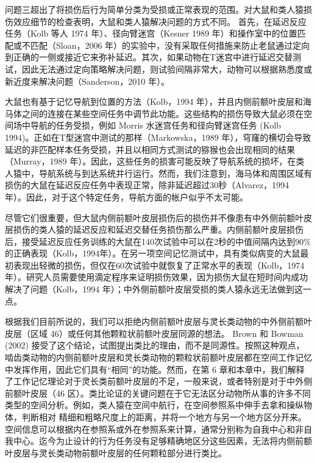\par 
问题三超出了将损伤后行为简单分类为受损或正常表现的范围。对大鼠和类人猿损伤效应细节的检查表明，大鼠和类人猿解决问题的方式不同。 首先，在延迟反应任务（Kolb 等人 1974 年）、径向臂迷宫（Kesner 1989 年）和操作室中的位置匹配或不匹配（Sloan，2006 年）的实验中，没有采取任何措施来防止老鼠通过定向到正确的一侧或接近它来弥补延迟。其次，如果动物在T迷宫中进行延迟交替测试，因此无法通过定向策略解决问题，则试验间隔非常大，动物可以根据熟悉度或新近度来解决问题（Sanderson，2010 年）。
\par 
大鼠也有基于记忆导航到位置的方法（Kolb，1994 年），并且内侧前额叶皮层和海马体之间的连接在某些空间任务中调节此功能。这些结构的损伤导致大鼠必须在空间场中导航的任务受损，例如 Morris 水迷宫任务和径向臂迷宫任务 (Kolb 1994)。正如在T型迷宫中测试的那样（Markowska，1989 年），穹窿的横切会导致延迟的非匹配样本任务受损，并且以相同方式测试的猕猴也会出现相同的结果（Murray，1989 年）。因此，这些任务的损害可能反映了导航系统的损坏，在类人猿中，导航系统与到达系统并行运行。然而，我们注意到，海马体和周围区域有损伤的大鼠在延迟反应任务中表现正常，除非延迟超过30秒（Alvarez，1994 年）。因此，对于这个特定任务，导航方面的帐户似乎不太可能。
\par 
尽管它们很重要，但大鼠内侧前额叶皮层损伤后的损伤并不像患有中外侧前额叶皮层损伤的类人猿的延迟反应和延迟交替任务损伤那么严重。内侧前额叶皮层损伤后，接受延迟反应任务训练的大鼠在140次试验中可以在2秒的中值间隔内达到90$\%$的正确表现（Kolb，1994年）。在另一项空间记忆测试中，具有类似病变的大鼠最初表现出轻微的损伤，但仅在60次试验中就恢复了正常水平的表现（Kolb，1974年）。研究人员需要使用滴定程序来证明损伤效果，因为损伤大鼠在短时间内成功解决了问题（Kolb，1994 年）；中外侧前额叶皮层受损的类人猿永远无法做到这一点。
\par 
根据我们目前所说的，我们可以拒绝内侧前额叶皮层与灵长类动物的中外侧前额叶皮层（区域 46）或任何其他颗粒状前额叶皮层同源的想法。 Brown 和 Bowman (2002) 接受了这个结论，试图提出类比的理由，而不是同源性。按照这种观点，啮齿类动物的内侧前额叶皮层和灵长类动物的颗粒状前额叶皮层都在空间工作记忆中发挥作用，因此它们具有“相同”的功能。然而，在第 6 章和本章中，我们解释了工作记忆理论对于灵长类前额叶皮层的不足，一般来说，或者特别是对于中外侧前额叶皮层（46 区）。类比论证的关键问题在于它无法区分动物所从事的许多不同类型的空间分析。例如，类人猿在空间中航行，在空间参照系中伸手去拿和操纵物体，判断相对 精细和粗略尺度上的距离，并将一个地方与另一个地方区分开来。空间信息可以根据内在参照系或外在参照系来计算，通常分别称为自我中心和非自我中心。迄今为止设计的行为任务没有足够精确地区分这些因素，无法将内侧前额叶皮层与灵长类动物前额叶皮层的任何颗粒部分进行类比。
